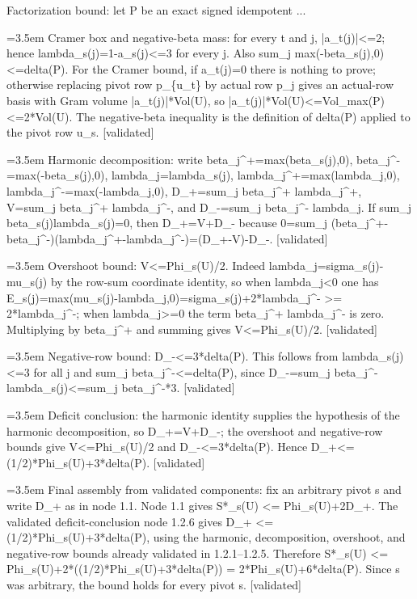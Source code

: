 \documentclass{article}
\newcommand{\step}[1]{\par\noindent\hangindent=3.5em\hangafter=1%
  \makebox[3.5em][l]{\textbf{#1.}}}
\newcommand{\steptag}[1]{\hfill{\small\textsf{[#1]}}}
\begin{document}
\begin{proofbox}{Factorization bound: let P be an exact signed idempotent ...}
\step{1.2.2} Cramer box and negative-beta mass: for every t and j, |a\_t(j)|<=2; hence lambda\_s(j)=1-a\_s(j)<=3 for every j. Also sum\_j max(-beta\_s(j),0)<=delta(P). For the Cramer bound, if a\_t(j)=0 there is nothing to prove; otherwise replacing pivot row p\_\{u\_t\} by actual row p\_j gives an actual-row basis with Gram volume |a\_t(j)|*Vol(U), so |a\_t(j)|*Vol(U)<=Vol\_max(P)<=2*Vol(U). The negative-beta inequality is the definition of delta(P) applied to the pivot row u\_s. \steptag{validated} \\[4pt]
\step{1.2.3} Harmonic decomposition: write beta\_j\textasciicircum{}+=max(beta\_s(j),0), beta\_j\textasciicircum{}-=max(-beta\_s(j),0), lambda\_j=lambda\_s(j), lambda\_j\textasciicircum{}+=max(lambda\_j,0), lambda\_j\textasciicircum{}-=max(-lambda\_j,0), D\_+=sum\_j beta\_j\textasciicircum{}+ lambda\_j\textasciicircum{}+, V=sum\_j beta\_j\textasciicircum{}+ lambda\_j\textasciicircum{}-, and D\_-=sum\_j beta\_j\textasciicircum{}- lambda\_j. If sum\_j beta\_s(j)lambda\_s(j)=0, then D\_+=V+D\_- because 0=sum\_j (beta\_j\textasciicircum{}+-beta\_j\textasciicircum{}-)(lambda\_j\textasciicircum{}+-lambda\_j\textasciicircum{}-)=(D\_+-V)-D\_-. \steptag{validated} \\[4pt]
\step{1.2.4} Overshoot bound: V<=Phi\_s(U)/2. Indeed lambda\_j=sigma\_s(j)-mu\_s(j) by the row-sum coordinate identity, so when lambda\_j<0 one has E\_s(j)=max(mu\_s(j)-lambda\_j,0)=sigma\_s(j)+2*lambda\_j\textasciicircum{}- >= 2*lambda\_j\textasciicircum{}-; when lambda\_j>=0 the term beta\_j\textasciicircum{}+ lambda\_j\textasciicircum{}- is zero. Multiplying by beta\_j\textasciicircum{}+ and summing gives V<=Phi\_s(U)/2. \steptag{validated} \\[4pt]
\step{1.2.5} Negative-row bound: D\_-<=3*delta(P). This follows from lambda\_s(j)<=3 for all j and sum\_j beta\_j\textasciicircum{}-<=delta(P), since D\_-=sum\_j beta\_j\textasciicircum{}- lambda\_s(j)<=sum\_j beta\_j\textasciicircum{}-*3. \steptag{validated} \\[4pt]
\step{1.2.6} Deficit conclusion: the harmonic identity supplies the hypothesis of the harmonic decomposition, so D\_+=V+D\_-; the overshoot and negative-row bounds give V<=Phi\_s(U)/2 and D\_-<=3*delta(P). Hence D\_+<=(1/2)*Phi\_s(U)+3*delta(P). \steptag{validated} \\[4pt]
\step{1.3} Final assembly from validated components: fix an arbitrary pivot s and write D\_+ as in node 1.1. Node 1.1 gives S*\_s(U) <= Phi\_s(U)+2D\_+. The validated deficit-conclusion node 1.2.6 gives D\_+ <= (1/2)*Phi\_s(U)+3*delta(P), using the harmonic, decomposition, overshoot, and negative-row bounds already validated in 1.2.1--1.2.5. Therefore S*\_s(U) <= Phi\_s(U)+2*((1/2)*Phi\_s(U)+3*delta(P)) = 2*Phi\_s(U)+6*delta(P). Since s was arbitrary, the bound holds for every pivot s. \steptag{validated} \\[6pt]

\end{proofbox}
\end{document}
